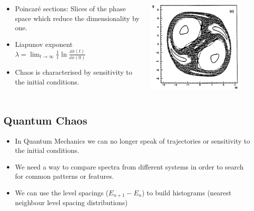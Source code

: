 \documentclass[a4,compress]{beamer}
\begin{document}
\begin{frame}
  \begin{columns}[c]
  \begin{column}{0.6\textwidth}
    \begin{itemize}
      \item Poincaré sections: Slices of the phase space which reduce the
      dimensionality by one.
      \item Liapunov exponent
      \(
        \lambda = \lim_{t \to \infty} \frac{1}{t} \ln{\frac{\dd{x}(t)}{\dd{x}(0)}}
      \)
      \item Chaos is characterised by sensitivity to the initial conditions.
    \end{itemize}
  \end{column}
  \begin{column}{0.4\textwidth}
    \includegraphics[width=0.9\textwidth]{ponicare-sections-e_120}
  \end{column}
  \end{columns}

\end{frame}

\subsection{Quantum Chaos}


\begin{frame}
  \begin{itemize}
    \item In Quantum Mechanics we can no longer speak of trajectories
    or sensitivity to the initial conditions.
    \item We need a way to compare spectra from different systems
    in order to search for common patterns or features.
    \item We can use the level spacings (\(E_{n+1} - E_n\)) to build
    histograms (nearest neighbour level spacing distributions)
  \end{itemize}
\end{frame}
\end{document}
